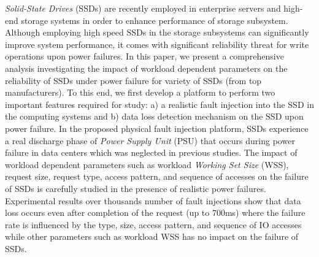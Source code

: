 \emph{Solid-State Drives} (SSDs) are recently employed in enterprise servers and high-end storage systems in order to enhance performance of storage subsystem. Although employing high speed SSDs in the storage subsystems can significantly improve system performance, it comes with significant reliability threat for write operations upon power failures. 
In this paper, we present a comprehensive analysis investigating the impact of workload dependent parameters
on the reliability of SSDs under power failure for variety of SSDs (from top manufacturers). To this end, we first develop a platform to perform two important features required for study: a) a realistic fault injection into the SSD in the computing systems and b) data loss detection mechanism on the SSD upon power failure. In the proposed physical fault injection platform, SSDs experience a real discharge phase of \emph{Power Supply Unit} (PSU) that occurs during power failure in data centers which was neglected in previous studies.
The impact of workload dependent parameters such as workload \emph{Working Set Size} (WSS), request size, request type, access pattern, and sequence of accesses on the failure of SSDs is carefully studied in the presence of realistic power failures. Experimental results over thousands number of fault injections show that data loss occurs even after completion of the request (up to 700ms) where the failure rate is influenced by the type, size, access pattern, and sequence of IO accesses while other parameters such as workload WSS has no impact on the failure of SSDs.
